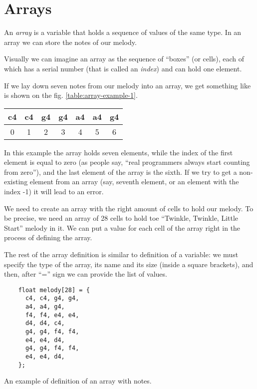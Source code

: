 \documentclass[../sparc.tex]{subfiles}
\begin{document}
\section{Arrays}

An \emph{array} is a variable that holds a sequence of values of the same type.
In an array we can store the notes of our melody.

Visually we can imagine an array as the sequence of ``boxes'' (or cells), each
of which has a serial number (that is called an \emph{index}) and can hold one
element.

If we lay down seven notes from our melody into an array, we get something like
is shown on the fig. \ref{table:array-example-1}.

\begin{tabular}{|p{1cm}|p{1cm}|p{1cm}|p{1cm}|p{1cm}|p{1cm}|p{1cm}|}
  \hline
  c4 & c4 & g4 & g4 & a4 & a4 & g4 \\
  \hline
  \multicolumn{1}{c}{0}
  & \multicolumn{1}{c}{1}
  & \multicolumn{1}{c}{2}
  & \multicolumn{1}{c}{3}
  & \multicolumn{1}{c}{4}
  & \multicolumn{1}{c}{5}
  & \multicolumn{1}{c}{6}
  \label{table:array-example-1}
\end{tabular}

In this example the array holds seven elements, while the index of the first
element is equal to zero (as people say, ``real programmers always start
counting from zero''), and the last element of the array is the sixth.  If we
try to get a non-existing element from an array (say, seventh element, or an
element with the index -1) it will lead to an error.

We need to create an array with the right amount of cells to hold our melody.
To be precise, we need an array of 28 cells to hold toe ``Twinkle, Twinkle,
Little Start'' melody in it.  We can put a value for each cell of the array
right in the process of defining the array.

The rest of the array definition is similar to definition of a variable: we must
specify the type of the array, its name and its size (inside a square brackets),
and then, after ``='' sign we can provide the list of values.

\begin{listing}[ht]
  \begin{verbatim}
    float melody[28] = {
      c4, c4, g4, g4,
      a4, a4, g4,
      f4, f4, e4, e4,
      d4, d4, c4,
      g4, g4, f4, f4,
      e4, e4, d4,
      g4, g4, f4, f4,
      e4, e4, d4,
    };
  \end{verbatim}
  \label{listing:music-array-example-1}
  \caption{An example of definition of an array with notes.}
\end{listing}
\end{document}
